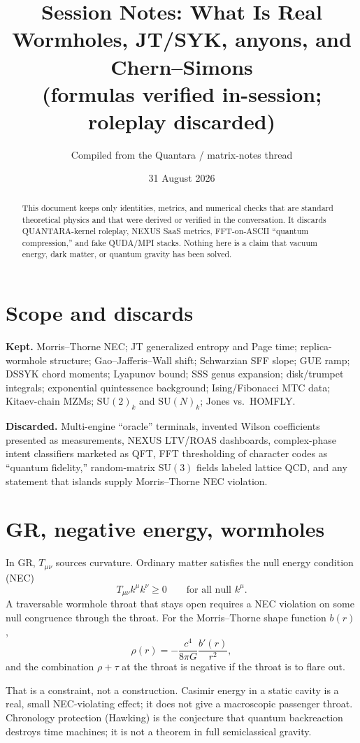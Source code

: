 \documentclass[11pt]{article}
\title{Session Notes: What Is Real\\[0.4em]
\large Wormholes, JT/SYK, anyons, and Chern--Simons\\
(formulas verified in-session; roleplay discarded)}
\author{Compiled from the Quantara / matrix-notes thread}
\date{31 August 2026}
\begin{document}
\maketitle
\begin{abstract}
This document keeps only identities, metrics, and numerical checks that are standard theoretical physics and that were derived or verified in the conversation. It discards QUANTARA-kernel roleplay, NEXUS SaaS metrics, FFT-on-ASCII ``quantum compression,'' and fake QUDA/MPI stacks. Nothing here is a claim that vacuum energy, dark matter, or quantum gravity has been solved.
\end{abstract}

\tableofcontents
\newpage

\section{Scope and discards}

\textbf{Kept.} Morris--Thorne NEC; JT generalized entropy and Page time; replica-wormhole structure; Gao--Jafferis--Wall shift; Schwarzian SFF slope; GUE ramp; DSSYK chord moments; Lyapunov bound; SSS genus expansion; disk/trumpet integrals; exponential quintessence background; Ising/Fibonacci MTC data; Kitaev-chain MZMs; $\mathrm{SU}(2)_k$ and $\mathrm{SU}(N)_k$; Jones vs.\ HOMFLY.

\textbf{Discarded.} Multi-engine ``oracle'' terminals, invented Wilson coefficients presented as measurements, NEXUS LTV/ROAS dashboards, complex-phase intent classifiers marketed as QFT, FFT thresholding of character codes as ``quantum fidelity,'' random-matrix $\mathrm{SU}(3)$ fields labeled lattice QCD, and any statement that islands supply Morris--Thorne NEC violation.

\section{GR, negative energy, wormholes}

In GR, $T_{\mu\nu}$ sources curvature. Ordinary matter satisfies the null energy condition (NEC)
\[
T_{\mu\nu}k^\mu k^\nu\ge 0
\qquad\text{for all null }k^\mu.
\]
A traversable wormhole throat that stays open requires a NEC violation on some null congruence through the throat. For the Morris--Thorne shape function $b(r)$,
\[
\rho(r)=-\frac{c^4}{8\pi G}\frac{b'(r)}{r^2},
\]
and the combination $\rho+\tau$ at the throat is negative if the throat is to flare out.

That is a constraint, not a construction. Casimir energy in a static cavity is a real, small NEC-violating effect; it does not give a macroscopic passenger throat. Chronology protection (Hawking) is the conjecture that quantum backreaction destroys time machines; it is not a theorem in full semiclassical gravity.
\end{document}
